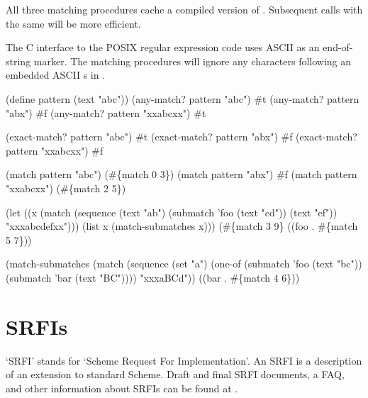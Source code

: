 All three matching procedures cache a compiled version of .
Subsequent calls with the same  will be more efficient.

The C interface to the POSIX regular expression code uses ASCII 
 as an end-of-string marker.
The matching procedures will ignore any characters following an
 embedded ASCII s in .

\begin{example}
(define pattern (text "abc"))
(any-match? pattern "abc")         \evalsto #t
(any-match? pattern "abx")         \evalsto #f
(any-match? pattern "xxabcxx")     \evalsto #t

(exact-match? pattern "abc")       \evalsto #t
(exact-match? pattern "abx")       \evalsto #f
(exact-match? pattern "xxabcxx")   \evalsto #f

(match pattern "abc")              \evalsto (#\{match 0 3\})
(match pattern "abx")              \evalsto #f
(match pattern "xxabcxx")          \evalsto (#\{match 2 5\})

(let ((x (match (sequence (text "ab")
                          (submatch 'foo (text "cd"))
                          (text "ef"))
                "xxxabcdefxx")))
  (list x (match-submatches x)))
  \evalsto (#\{match 3 9\} ((foo . #\{match 5 7\}))

(match-submatches
  (match (sequence
           (set "a")
           (one-of (submatch 'foo (text "bc"))
                   (submatch 'bar (text "BC"))))
         "xxxaBCd"))
  \evalsto ((bar . #\{match 4 6\}))
\end{example}

\section{SRFIs}

`SRFI' stands for `Scheme Request For Implementation'.
An SRFI is a description of an extension to standard Scheme.
Draft and final SRFI documents, a FAQ, and other information about SRFIs
 can be found at
.

